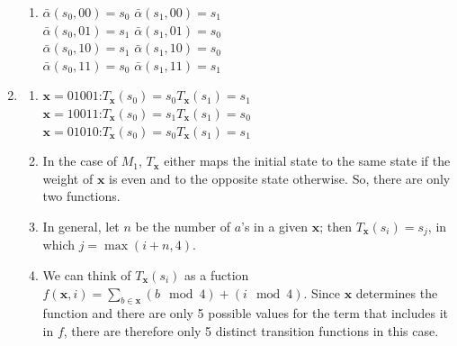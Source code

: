 \documentclass{article}
\begin{document}
\begin{enumerate}
\begin{enumerate}[label=(\alph*)]
        \item 
        $\bar{\alpha}(s_0, 00) = s_0$\quad
        $\bar{\alpha}(s_1, 00) = s_1$\\
        $\bar{\alpha}(s_0, 01) = s_1$\quad
        $\bar{\alpha}(s_1, 01) = s_0$\\
        $\bar{\alpha}(s_0, 10) = s_1$\quad
        $\bar{\alpha}(s_1, 10) = s_0$\\
        $\bar{\alpha}(s_0, 11) = s_0$\quad
        $\bar{\alpha}(s_1, 11) = s_1$
    \end{enumerate}

    \item
        \begin{enumerate}[label=(\alph*)]
            \item 
            $\mathbf{x} = 01001$:\quad $T_\mathbf{x}(s_0) = s_0$\quad $T_\mathbf{x}(s_1) = s_1$\\
            $\mathbf{x} = 10011$:\quad $T_\mathbf{x}(s_0) = s_1$\quad $T_\mathbf{x}(s_1) = s_0$\\
            $\mathbf{x} = 01010$:\quad $T_\mathbf{x}(s_0) = s_0$\quad $T_\mathbf{x}(s_1) = s_1$

            \item In the case of $M_1$, $T_\mathbf{x}$ either maps the initial state to the same state if the weight of $\mathbf{x}$ is even and to the opposite state otherwise. So, there are only two functions.

            \item In general, let $n$ be the number of $a$'s in a given $\mathbf{x}$; then $T_\mathbf{x}(s_i) = s_j$, in which $j = \max(i + n, 4)$.

            \item We can think of $T_\mathbf{x}(s_i)$ as a fuction $f(\mathbf{x}, i) = \sum\limits_{b \in \mathbf{x}} (b \mod 4) + (i \mod 4)$. Since $\mathbf{x}$ determines the function and there are only 5 possible values for the term that includes it in $f$, there are therefore only 5 distinct transition functions in this case.
        \end{enumerate}
\end{enumerate}
\end{document}

